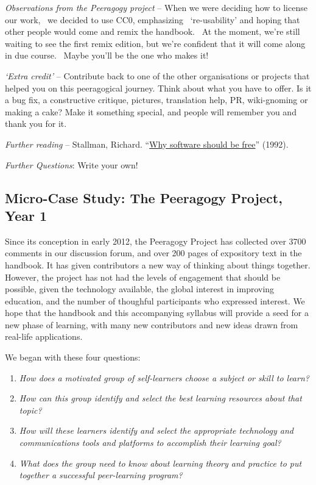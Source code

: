 \emph{Observations from the Peeragogy project} -- When we were deciding
how to license our work,~ we decided to use CC0, emphasizing~
`re-usability' and hoping that other people would come and remix the
handbook.~ At the moment, we're still waiting to see the first remix
edition, but we're confident that it will come along in due course.~
Maybe you'll be the one who makes it!

\emph{`Extra credit'} -- Contribute back to one of the other
organisations or projects that helped you on this peeragogical journey.
Think about what you have to offer. Is it a bug fix, a constructive
critique, pictures, translation help, PR, wiki-gnoming or making a cake?
Make it something special, and people will remember you and thank you
for it.

\emph{Further reading} -- Stallman, Richard.
``\href{http://www.gnu.org/philosophy/shouldbefree.html}{Why software
should be free}'' (1992).

\emph{Further Questions}: Write your own!

\subsection{{\small {Micro-}Case Study: The Peeragogy Project, Year
1}}\label{micro-case-study-the-peeragogy-project-year-1}

Since its conception in early 2012, the Peeragogy Project has collected
over 3700 comments in our discussion forum, and over 200 pages of
expository text in the handbook. It has given contributors a new way of
thinking about things together. However, the project has not had the
levels of engagement that should be possible, given the technology
available, the global interest in improving education, and the number of
thoughful participants who expressed interest. We hope that the handbook
and this accompanying syllabus will provide a seed for a new phase of
learning, with many new contributors and new ideas drawn from real-life
applications.

We began with these four questions:

\begin{enumerate}
\def\labelenumi{\arabic{enumi}.}
\item
  \emph{How does a motivated group of self-learners choose a subject or
  skill to learn?}
\item
  \emph{How can this group identify and select the best learning
  resources about that topic?}
\item
  \emph{How will these learners identify and select the appropriate
  technology and communications tools and platforms to accomplish their
  learning goal?}
\item
  \emph{What does the group need to know about learning theory and
  practice to put together a successful peer-learning program?}
\end{enumerate}

